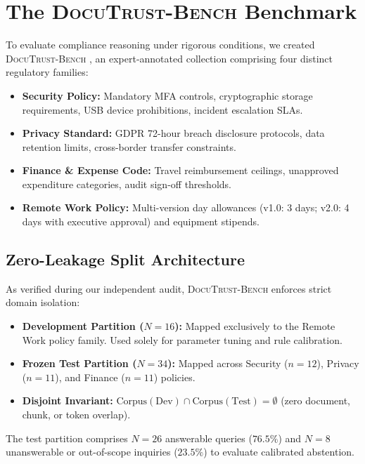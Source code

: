 \documentclass[journal,twoside]{IEEEtran}
\newcommand{\bench}{\textsc{DocuTrust-Bench}}
\begin{document}
\section{The \bench{} Benchmark}
\label{sec:bench}



To evaluate compliance reasoning under rigorous conditions, we created \bench{} , an expert-annotated collection comprising four distinct regulatory families:
\begin{itemize}
  \item \textbf{Security Policy:} Mandatory MFA controls, cryptographic storage requirements, USB device prohibitions, incident escalation SLAs.
  \item \textbf{Privacy Standard:} GDPR 72-hour breach disclosure protocols, data retention limits, cross-border transfer constraints.
  \item \textbf{Finance \& Expense Code:} Travel reimbursement ceilings, unapproved expenditure categories, audit sign-off thresholds.
  \item \textbf{Remote Work Policy:} Multi-version day allowances (v1.0: 3 days; v2.0: 4 days with executive approval) and equipment stipends.
\end{itemize}

\subsection{Zero-Leakage Split Architecture}
As verified during our independent audit, \bench{} enforces strict domain isolation:
\begin{itemize}
  \item \textbf{Development Partition ($N=16$):} Mapped exclusively to the Remote Work policy family. Used solely for parameter tuning and rule calibration.
  \item \textbf{Frozen Test Partition ($N=34$):} Mapped across Security ($n=12$), Privacy ($n=11$), and Finance ($n=11$) policies.
  \item \textbf{Disjoint Invariant:} $\text{Corpus}(\text{Dev}) \cap \text{Corpus}(\text{Test}) = \emptyset$ (zero document, chunk, or token overlap).
\end{itemize}
The test partition comprises $N=26$ answerable queries ($76.5\%$) and $N=8$ unanswerable or out-of-scope inquiries ($23.5\%$) to evaluate calibrated abstention.
\end{document}
